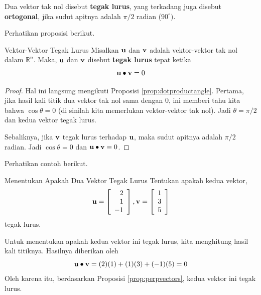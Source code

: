 Dua vektor tak nol disebut \textbf{tegak lurus},
 yang terkadang juga disebut \textbf{ortogonal}, jika
sudut apitnya adalah $\pi /2$ radian ($90^{\circ }).$

Perhatikan proposisi berikut.

\begin{proposition}{Vektor-Vektor Tegak Lurus}\label{prop:perpvectors}
Misalkan $\mathbf{u}$ dan $\mathbf{v}$ adalah vektor-vektor tak nol dalam $\mathbb{R}^n$. Maka,
$\mathbf{u}$ dan $\mathbf{v}$ disebut \textbf{tegak lurus}  tepat ketika
\begin{equation*}
\mathbf{u}
\bullet
\mathbf{v}
=
0
\end{equation*}
\end{proposition}

\ifdefined\showproofs
\begin{proof}
Hal ini langsung mengikuti Proposisi \ref{prop:dotproductangle}. Pertama, jika hasil kali titik
dua vektor tak nol sama dengan $0$, ini memberi tahu kita bahwa $\cos \theta
=0$ (di sinilah kita memerlukan vektor-vektor tak nol). Jadi $\theta = \pi /2$
dan kedua vektor tegak lurus.

Sebaliknya, jika $\mathbf{v}$ tegak lurus terhadap $\mathbf{u}$, maka
sudut apitnya adalah $\pi /2$ radian. Jadi $\cos \theta =0$ dan
$\mathbf{u} \bullet \mathbf{v} = 0$.
\end{proof}
\fi
Perhatikan contoh berikut.

\begin{example}{Menentukan Apakah Dua Vektor Tegak Lurus}\label{exa:perpendicularvectors}
Tentukan apakah kedua vektor,
\begin{equation*}
\mathbf{u}=
\left[
\begin{array}{r}
2 \\
1 \\
-1
\end{array}
\right],
\mathbf{v}
=
\left[
\begin{array}{r}
1 \\
3 \\
5
\end{array}
\right]
\end{equation*}
tegak lurus.
\end{example}

\begin{solution}
Untuk menentukan apakah kedua vektor ini tegak lurus, kita menghitung hasil kali titiknya.
Hasilnya diberikan oleh
\begin{equation*}
\mathbf{u} \bullet \mathbf{v}
=
(2)(1) + (1)(3) + (-1)(5)
=
0
\end{equation*}
Oleh karena itu, berdasarkan Proposisi \ref{prop:perpvectors}, kedua vektor ini tegak lurus.
\end{solution}

